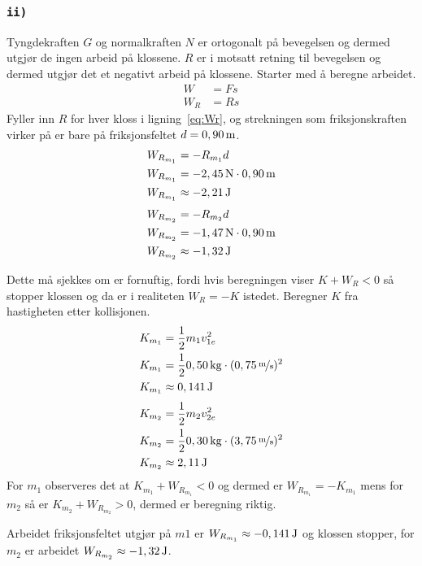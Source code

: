 \documentclass{article}
\let\oldsubsubsection\subsubsection
\renewcommand{\subsubsection}[1]{%
  \oldsubsubsection{\texttt{#1}}%
}
\begin{document}
\clearpage
\subsubsection{ii)}
Tyngdekraften \(G\) og normalkraften \(N\) er ortogonalt på bevegelsen og dermed utgjør de ingen arbeid på klossene. \(R\) er i motsatt retning til bevegelsen og dermed utgjør det et negativt arbeid på klossene. Starter med å beregne arbeidet.
\begin{equation}
\begin{split}
    W &= Fs \\
    W_R &= Rs
\end{split}
\label{eq:Wr}
\end{equation}
Fyller inn \(R\) for hver kloss i ligning~\ref{eq:Wr}, og strekningen som friksjonskraften virker på er bare på friksjonsfeltet \(d = \unit[0,90]{m}\).
\begin{equation*}
\begin{split}
    W_{R_{m_1}} &= - R_{m_1} d \\
    W_{R_{m_1}} &= - \unit[2,45]{N} \cdot \unit[0,90]{m} \\
    W_{R_{m_1}} &\approx - \unit[2,21]{J}
\end{split}
\end{equation*}
\begin{equation*}
\begin{split}
    W_{R_{m_2}} &= - R_{m_2} d \\
    W_{R_{m_2}} &= - \unit[1,47]{N} \cdot \unit[0,90]{m} \\
    W_{R_{m_2}} &\approx - \unit[1,32]{J}
\end{split}
\end{equation*}

Dette må sjekkes om er fornuftig, fordi hvis beregningen viser \(K + W_R < 0\) så stopper klossen og da er i realiteten \(W_R = - K\) istedet. Beregner \(K\) fra hastigheten etter kollisjonen.
\begin{equation*}
\begin{split}
    K_{m_1} &= \frac{1}{2} m_1 v^2_{1e} \\
    K_{m_1} &= \frac{1}{2} \unit[0,50]{kg} \cdot (\unitfrac[0,75]{m}{s})^2 \\
    K_{m_1} &\approx \unit[0,141]{J}
\end{split}
\end{equation*}
\begin{equation*}
\begin{split}
    K_{m_2} &= \frac{1}{2} m_2 v^2_{2e} \\
    K_{m_2} &= \frac{1}{2} \unit[0,30]{kg} \cdot (\unitfrac[3,75]{m}{s})^2 \\
    K_{m_2} &\approx \unit[2,11]{J}
\end{split}
\end{equation*}
For \(m_1\) observeres det at \(K_{m_1} + W_{R_{m_1}} < 0\) og dermed er \(W_{R_{m_1}} = - K_{m_1}\) mens for \(m_2\) så er \(K_{m_2} + W_{R_{m_2}} > 0\), dermed er beregning riktig. \par
Arbeidet friksjonsfeltet utgjør på \(m1\) er \underline{\underline{\(W_{R_{m_1}} \approx - \unit[0,141]{J}\)}} og klossen stopper, for \(m_2\) er arbeidet \underline{\underline{\(W_{R_{m_2}} \approx - \unit[1,32]{J}\)}}.
\end{document}
